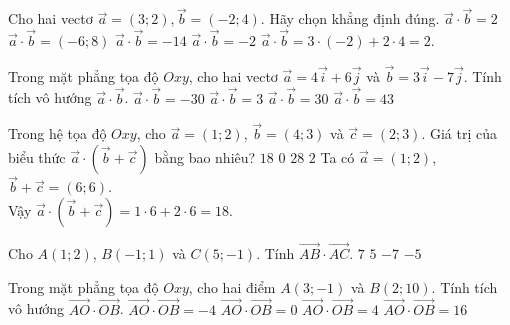 \begin{ex}%
	Cho hai vectơ $\overrightarrow{a}=\left( 3;2 \right),\overrightarrow{b}=\left( -2;4 \right)$. Hãy chọn khẳng định đúng.
	\choice
	{\True $\overrightarrow{a}\cdot \overrightarrow{b}=2$}
	{$\overrightarrow{a}\cdot \overrightarrow{b}=\left( -6;8 \right)$}
	{$\overrightarrow{a}\cdot \overrightarrow{b}=-14$}
	{$\overrightarrow{a}\cdot \overrightarrow{b}=-2$}
	\loigiai
	{$\overrightarrow{a}\cdot \overrightarrow{b}=3 \cdot (-2) + 2 \cdot 4 = 2$.
	}
\end{ex}
\begin{ex}%
	Trong mặt phẳng tọa độ $Oxy$, cho hai vectơ $\overrightarrow{a}=4\overrightarrow{i}+6\overrightarrow{j} $ và $\overrightarrow{b}=3\overrightarrow{i}-7\overrightarrow{j} $. Tính tích vô hướng $\overrightarrow{a} \cdot \overrightarrow{b} $.
	\choice
	{\True $\overrightarrow{a} \cdot \overrightarrow{b}=-30$}
	{$\overrightarrow{a} \cdot \overrightarrow{b}=3$}
	{$\overrightarrow{a} \cdot \overrightarrow{b}=30$}
	{$\overrightarrow{a} \cdot \overrightarrow{b}=43$}
\end{ex}

\begin{ex}%
	Trong hệ tọa độ $Oxy$, cho $\overrightarrow{a} = (1;2)$, $\overrightarrow{b} = (4;3)$ và $\overrightarrow{c} = (2;3)$. Giá trị của biểu thức $\overrightarrow{a} \cdot \left( \overrightarrow{b} + \overrightarrow{c} \right)$ bằng bao nhiêu?
	\choice
	{\True $18$}
	{$0$}
	{$28$}
	{$2$}
	\loigiai
	{
		Ta có $\overrightarrow{a} = (1;2)$, $\overrightarrow{b} + \overrightarrow{c} = (6;6)$.\\
		Vậy $\overrightarrow{a} \cdot \left( \overrightarrow{b} + \overrightarrow{c} \right) = 1 \cdot 6 + 2 \cdot 6 = 18$.
	}
\end{ex}
\begin{ex}%
	Cho $A\left(1;2\right)$, $B\left(-1;1\right)$ và $C\left(5;-1\right)$. Tính $\overrightarrow{AB}\cdot \overrightarrow{AC}$.
	\choice
	{$7$}
	{$5$}
	{$-7$}
	{\True $-5$}
\end{ex}
\begin{ex}%
	Trong mặt phẳng tọa độ $Oxy$, cho hai điểm $A\left(3;-1\right)$ và $B\left(2;10\right)$. Tính tích vô hướng $\overrightarrow{AO}\cdot \overrightarrow{OB}$.
	\choice
	{$\overrightarrow{AO}\cdot \overrightarrow{OB}=-4$}
	{$\overrightarrow{AO}\cdot \overrightarrow{OB}=0$}
	{\True $\overrightarrow{AO}\cdot \overrightarrow{OB}=4$}
	{$\overrightarrow{AO}\cdot \overrightarrow{OB}=16$}
\end{ex}

